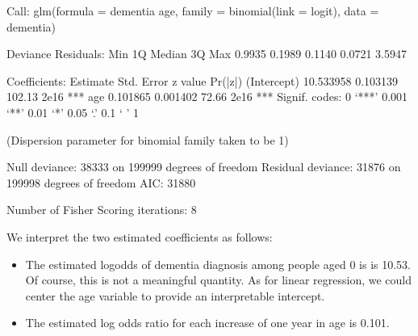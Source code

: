 \documentclass[letterpaper,10pt,english]{jupyterBook}
\begin{document}
\begin{sphinxVerbatim}[commandchars=\\\{\}]
          
\end{sphinxVerbatim}

\begin{sphinxVerbatim}[commandchars=\\\{\}]
Call:
glm(formula = dementia \PYGZti{} age, family = binomial(link = \PYGZdq{}logit\PYGZdq{}), 
    data = dementia)

Deviance Residuals: 
    Min       1Q   Median       3Q      Max  
\PYGZhy{}0.9935  \PYGZhy{}0.1989  \PYGZhy{}0.1140  \PYGZhy{}0.0721   3.5947  

Coefficients:
              Estimate Std. Error z value Pr(\PYGZgt{}|z|)    
(Intercept) \PYGZhy{}10.533958   0.103139 \PYGZhy{}102.13   \PYGZlt{}2e\PYGZhy{}16 ***
age           0.101865   0.001402   72.66   \PYGZlt{}2e\PYGZhy{}16 ***
\PYGZhy{}\PYGZhy{}\PYGZhy{}
Signif. codes:  0 ‘***’ 0.001 ‘**’ 0.01 ‘*’ 0.05 ‘.’ 0.1 ‘ ’ 1

(Dispersion parameter for binomial family taken to be 1)

    Null deviance: 38333  on 199999  degrees of freedom
Residual deviance: 31876  on 199998  degrees of freedom
AIC: 31880

Number of Fisher Scoring iterations: 8
\end{sphinxVerbatim}

\sphinxAtStartPar
We interpret the two estimated coefficients as follows:
\begin{itemize}
\item {} 
\sphinxAtStartPar
The estimated log\sphinxhyphen{}odds of dementia diagnosis among people aged 0 is is \sphinxhyphen{}10.53. Of course, this is not a meaningful quantity. As for linear regression, we could center the age variable to provide an interpretable intercept.

\item {} 
\sphinxAtStartPar
The estimated log odds ratio for each increase of one year in age is 0.101.

\end{itemize}
\end{document}
